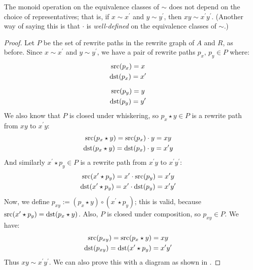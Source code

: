 \documentclass[../generics]{subfiles}
\begin{document}
\begin{proposition}
%
The monoid operation on the equivalence classes of $\sim$ does not depend on the choice of representatives; that is, if $x\sim x^\prime$ and $y\sim y^\prime$, then $xy\sim x^\prime y^\prime$. (Another way of saying this is that $\cdot$ is \emph{well-defined} on the equivalence classes of $\sim$.)
\end{proposition}
\begin{proof}
Let $P$ be the set of rewrite paths in the rewrite graph of $A$ and $R$, as before. Since $x\sim x^\prime$ and $y\sim y^\prime$, we have a pair of rewrite paths $p_x,\,p_y\in P$ where:
\begin{gather*}
\operatorname{src}(p_x)=x\\
\operatorname{dst}(p_x)=x^\prime\\[\medskipamount]
\operatorname{src}(p_y)=y\\
\operatorname{dst}(p_y)=y^\prime
\end{gather*}
We also know that $P$ is closed under whiskering, so $p_x\star y\in P$ is a rewrite path from $xy$ to $x^\prime y$:
\begin{gather*}
\operatorname{src}(p_x\star y)=\operatorname{src}(p_x)\cdot y=xy\\
\operatorname{dst}(p_x\star y)=\operatorname{dst}(p_x)\cdot y=x^\prime y
\end{gather*}
And similarly $x^\prime\star p_y\in P$ is a rewrite path from $x^\prime y$ to $x^\prime y^\prime$:
\begin{gather*}
\operatorname{src}(x^\prime \star p_y)=x^\prime \cdot\operatorname{src}(p_y)=x^\prime y\\
\operatorname{dst}(x^\prime \star p_y)=x^\prime \cdot\operatorname{dst}(p_y)=x^\prime y^\prime
\end{gather*}
Now, we define $p_{xy}:=(p_x\star y) \circ (x^\prime\star p_y)$; this is valid, because $\operatorname{src}(x^\prime \star p_y)=\operatorname{dst}(p_x\star y)$.
Also, $P$ is closed under composition, so $p_{xy}\in P$. We have:
\begin{gather*}
\operatorname{src}(p_{xy}) = \operatorname{src}(p_x\star y) = xy\\
\operatorname{dst}(p_{xy}) = \operatorname{dst}(x^\prime \star p_y) = x^\prime y^\prime
\end{gather*}
Thus $xy\sim x^\prime y^\prime$. We can also prove this with a diagram as shown in .
\end{proof}
\end{document}
